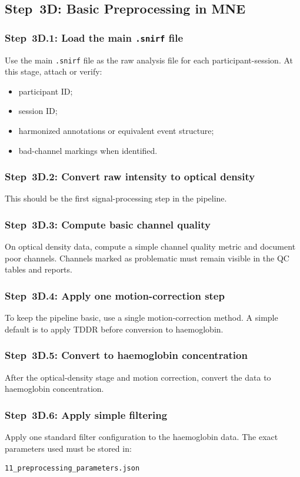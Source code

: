 \subsection{Step~3D: Basic Preprocessing in MNE}

\subsubsection{Step~3D.1: Load the main \texttt{.snirf} file}
Use the main \texttt{.snirf} file as the raw analysis file for each participant-session.
At this stage, attach or verify:
\begin{itemize}
    \item participant ID;
    \item session ID;
    \item harmonized annotations or equivalent event structure;
    \item bad-channel markings when identified.
\end{itemize}

\subsubsection{Step~3D.2: Convert raw intensity to optical density}
This should be the first signal-processing step in the pipeline.

\subsubsection{Step~3D.3: Compute basic channel quality}
On optical density data, compute a simple channel quality metric and document poor channels.
Channels marked as problematic must remain visible in the QC tables and reports.

\subsubsection{Step~3D.4: Apply one motion-correction step}
To keep the pipeline basic, use a single motion-correction method.
A simple default is to apply TDDR before conversion to haemoglobin.

\subsubsection{Step~3D.5: Convert to haemoglobin concentration}
After the optical-density stage and motion correction, convert the data to haemoglobin concentration.

\subsubsection{Step~3D.6: Apply simple filtering}
Apply one standard filter configuration to the haemoglobin data.
The exact parameters used must be stored in:
\begin{verbatim}
11_preprocessing_parameters.json
\end{verbatim}

